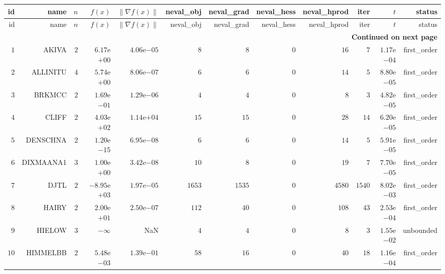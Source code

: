 \begin{longtable}{rrrrrrrrrrrr}
  \hline
  id & name & \(n\) & \(f(x)\) & \(\|\nabla f(x)\|\) & neval\_obj & neval\_grad & neval\_hess & neval\_hprod & iter & \(t\) & status \\\hline
  \endfirsthead
  \hline
  id & name & \(n\) & \(f(x)\) & \(\|\nabla f(x)\|\) & neval\_obj & neval\_grad & neval\_hess & neval\_hprod & iter & \(t\) & status \\\hline
  \endhead
  \hline
  \multicolumn{12}{r}{{\bfseries Continued on next page}}\\
  \hline
  \endfoot
  \endlastfoot
  \(     1\) & AKIVA & \(     2\) & \( 6.17\)e\(+00\) & \( 4.06\)e\(-05\) & \(     8\) & \(     8\) & \(     0\) & \(    16\) & \(     7\) & \( 1.17\)e\(-04\) & first\_order \\
  \(     2\) & ALLINITU & \(     4\) & \( 5.74\)e\(+00\) & \( 8.06\)e\(-07\) & \(     6\) & \(     6\) & \(     0\) & \(    14\) & \(     5\) & \( 8.80\)e\(-05\) & first\_order \\
  \(     3\) & BRKMCC & \(     2\) & \( 1.69\)e\(-01\) & \( 1.29\)e\(-06\) & \(     4\) & \(     4\) & \(     0\) & \(     8\) & \(     3\) & \( 4.82\)e\(-05\) & first\_order \\
  \(     4\) & CLIFF & \(     2\) & \( 4.03\)e\(+02\) & \( 1.14\)e\(+04\) & \(    15\) & \(    15\) & \(     0\) & \(    28\) & \(    14\) & \( 6.20\)e\(-05\) & first\_order \\
  \(     5\) & DENSCHNA & \(     2\) & \( 1.20\)e\(-15\) & \( 6.95\)e\(-08\) & \(     6\) & \(     6\) & \(     0\) & \(    14\) & \(     5\) & \( 5.91\)e\(-05\) & first\_order \\
  \(     6\) & DIXMAANA1 & \(     3\) & \( 1.00\)e\(+00\) & \( 3.42\)e\(-08\) & \(    10\) & \(     8\) & \(     0\) & \(    19\) & \(     7\) & \( 7.70\)e\(-05\) & first\_order \\
  \(     7\) & DJTL & \(     2\) & \(-8.95\)e\(+03\) & \( 1.97\)e\(-05\) & \(  1653\) & \(  1535\) & \(     0\) & \(  4580\) & \(  1540\) & \( 8.02\)e\(-03\) & first\_order \\
  \(     8\) & HAIRY & \(     2\) & \( 2.00\)e\(+01\) & \( 2.50\)e\(-07\) & \(   112\) & \(    40\) & \(     0\) & \(   108\) & \(    43\) & \( 2.53\)e\(-04\) & first\_order \\
  \(     9\) & HIELOW & \(     3\) & \(-\infty\) &       NaN & \(     4\) & \(     4\) & \(     0\) & \(     8\) & \(     3\) & \( 1.55\)e\(-02\) & unbounded \\
  \(    10\) & HIMMELBB & \(     2\) & \( 5.48\)e\(-03\) & \( 1.39\)e\(-01\) & \(    58\) & \(    16\) & \(     0\) & \(    40\) & \(    18\) & \( 1.16\)e\(-04\) & first\_order \\

\end{longtable}
